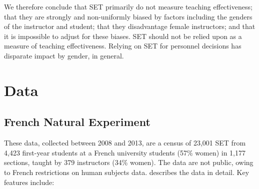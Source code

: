 \documentclass[12pt]{article}
\begin{document}
We therefore conclude that SET primarily do not measure teaching effectiveness; that 
they are strongly and non-uniformly biased by factors including the genders of the instructor
and student; that they disadvantage female instructors;
and that it is impossible to adjust for these biases. 
SET should not be relied upon as a measure of teaching effectiveness.
Relying on SET for personnel decisions has disparate impact by gender, in general. 

\section{Data}
\subsection{French Natural Experiment}
These data, collected between 2008 and 2013, are a census of 23,001 SET from
4,423 first-year students at a French university students (57\% women) in 1,177
sections, taught by 379 instructors (34\% women). 
The data are not public, owing to French restrictions on human subjects data.
\citet{Boring2015} describes the data in detail.
Key features include:
\end{document}
